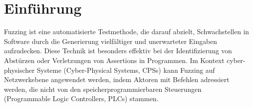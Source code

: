 
\section{Einführung}\label{sec:introduction}
Fuzzing ist eine automatisierte Testmethode, die darauf abzielt, Schwachstellen in Software durch die Generierung vielfältiger
und unerwarteter Eingaben aufzudecken.
Diese Technik ist besonders effektiv bei der Identifizierung von Abstürzen oder Verletzungen von Assertions in Programmen.
Im Kontext cyber-physischer Systeme (Cyber-Physical Systems, CPSs) kann Fuzzing auf Netzwerkebene angewendet werden,
indem Aktoren mit Befehlen adressiert werden, die nicht von den speicherprogrammierbaren Steuerungen
(Programmable Logic Controllers, PLCs) stammen.